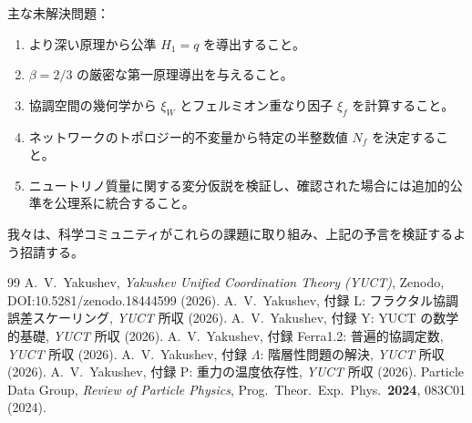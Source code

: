 \documentclass[12pt,a4paper]{article}
\begin{document}
	主な未解決問題：
	\begin{enumerate}[label=(\roman*)]
		\item より深い原理から公準 \(H_1 = q\) を導出すること。
		\item \(\beta = 2/3\) の厳密な第一原理導出を与えること。
		\item 協調空間の幾何学から \(\xi_W\) とフェルミオン重なり因子 \(\xi_f\) を計算すること。
		\item ネットワークのトポロジー的不変量から特定の半整数値 \(N_f\) を決定すること。
		\item ニュートリノ質量に関する変分仮説を検証し、確認された場合には追加的公準を公理系に統合すること。
	\end{enumerate}
	我々は、科学コミュニティがこれらの課題に取り組み、上記の予言を検証するよう招請する。
	
	\begin{thebibliography}{99}
		 A.~V.~Yakushev, \emph{Yakushev Unified Coordination Theory (YUCT)}, Zenodo, DOI:10.5281/zenodo.18444599 (2026).
		 A.~V.~Yakushev, 付録 L: フラクタル協調誤差スケーリング, \emph{YUCT} 所収 (2026).
		 A.~V.~Yakushev, 付録 Y: YUCT の数学的基礎, \emph{YUCT} 所収 (2026).
		 A.~V.~Yakushev, 付録 Ferra1.2: 普遍的協調定数, \emph{YUCT} 所収 (2026).
		 A.~V.~Yakushev, 付録 \(\Lambda\): 階層性問題の解決, \emph{YUCT} 所収 (2026).
		 A.~V.~Yakushev, 付録 P: 重力の温度依存性, \emph{YUCT} 所収 (2026).
		 Particle Data Group, \emph{Review of Particle Physics}, Prog.\ Theor.\ Exp.\ Phys.\ \textbf{2024}, 083C01 (2024).
	\end{thebibliography}
	
\end{document}
